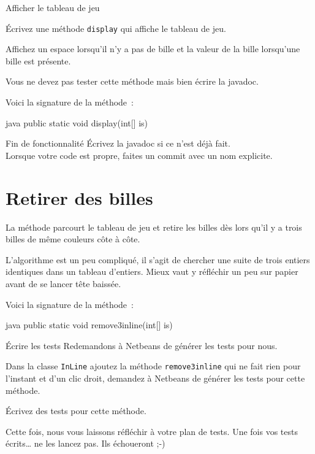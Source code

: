 \documentclass[a4paper,11pt]{style-esi/td}
\newcommand{\findefonctionnalite}{
\begin{infoit}{Fin de fonctionnalité}
	Écrivez la javadoc si ce n'est déjà fait.\\  
	Lorsque votre code est propre, faites un commit avec un nom explicite. 
\end{infoit}
}
\begin{document}
\begin{Exercice}{Afficher le tableau de jeu}
	\begin{steps}
		\item Écrivez une méthode \texttt{display} qui affiche le tableau de jeu. 
	\end{steps}

	Affichez un espace lorsqu'il n'y a pas de bille et la valeur de la bille
	lorsqu'une bille est présente. 

	Vous ne devez pas tester cette méthode mais bien écrire la javadoc.

	Voici la signature de la méthode~:
	\begin{Code}{java}
		public static void display(int[] is)
	\end{Code}

\end{Exercice}

\findefonctionnalite



\section{Retirer des billes}

La méthode  parcourt le tableau de jeu et retire les
billes dès lors qu'il y a trois billes de même couleurs côte à côte. 

L'algorithme est un peu compliqué, il s'agit de chercher une suite de trois
entiers identiques dans un tableau d'entiers. Mieux vaut y réfléchir un peu sur
papier avant de se lancer tête baissée. 

Voici la signature de la méthode~:
\begin{Code}{java}
	public static void remove3inline(int[] is)
\end{Code}

\begin{Exercice}{Écrire les tests}
	Redemandons à Netbeans de générer les tests pour nous.
	\begin{steps}		
		\item Dans la classe \texttt{InLine} ajoutez la méthode 
			\texttt{remove3inline}
			qui ne fait rien pour l'instant et d'un clic droit, demandez
			à Netbeans de générer les tests pour cette méthode. 

		\item Écrivez des tests pour cette méthode.
	\end{steps}

	Cette fois, nous vous laissons réfléchir à votre plan de tests. Une fois
	vos tests écrits… ne les lancez pas. Ils échoueront ;-)

\end{Exercice}
\end{document}
